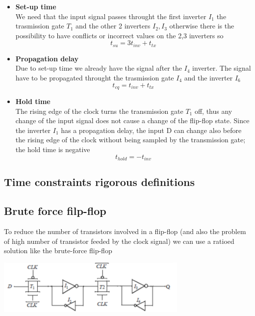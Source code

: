 \begin{itemize}

\item 
{\bf Set-up time}\\
We need that the input signal passes throught the first inverter $I_1$ the trasmission gate $T_1$ and the other 2 inverters $I_2,I_3$ otherwise there is the possibility to have conflicts or incorrect values on the 2,3 inverters so
\begin{equation}
t_{su}=3t_{inv}+t_{tx}
\end{equation}

\item 
{\bf Propagation delay}\\
Due to set-up time we already have the signal after the $I_4$ inverter. The signal have to be propagated throught the trasmission gate $I_4$ and the inverter $I_6$
\begin{equation}
t_{cq}=t_{inv}+t_{tx}
\end{equation}

\item
{\bf Hold time}\\
The rising edge of the clock turns the transmission gate $T_1$ off, thus any change of the input signal does not cause a change of the flip-flop state.
Since the inverter $I_1$ has a propagation delay, the input D can change also before the rising edge of the clock without being sampled by the transmission gate; the hold time is negative
\begin{equation}
t_{hold}=-t_{inv}
\end{equation}

\end{itemize}


\subsection{Time constraints rigorous definitions}





\subsection{Brute force filp-flop}

To reduce the number of transistors involved in a flip-flop (and also the problem of high number of transistor feeded by the clock signal) we can use a ratioed solution like the brute-force flip-flop

\centering
\includegraphics[width=0.7\textwidth]{C10_12.png}\\
\raggedright

